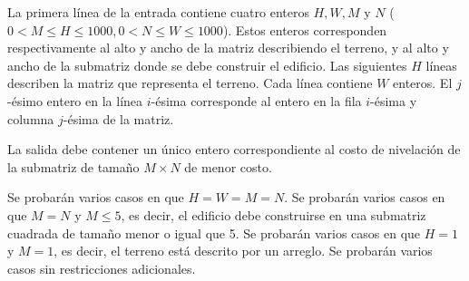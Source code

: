 \documentclass{oci}
\begin{document}
\begin{inputDescription}
  La primera línea de la entrada contiene cuatro enteros $H, W, M$ y $N$
  ($0 < M \leq H\leq 1000, 0 < N \leq W \leq 1000$).
  Estos enteros corresponden respectivamente al alto y ancho de la matriz describiendo el terreno,
  y al alto y ancho de la submatriz donde se debe construir el edificio.
  Las siguientes $H$ líneas describen la matriz que representa el terreno.
  Cada línea contiene $W$ enteros.
  El $j$-ésimo entero en la línea $i$-ésima corresponde al entero en la fila $i$-ésima y
  columna $j$-ésima de la matriz.
\end{inputDescription}

\begin{outputDescription}
  La salida debe contener un único entero correspondiente al costo de nivelación de la submatriz
  de tamaño $M\times N$ de menor costo.
\end{outputDescription}


\begin{scoreDescription}
  Se probarán varios casos en que $H=W=M=N$.
  Se probarán varios casos en que $M=N$ y $M\leq 5$, es decir, el edificio debe construirse en una
  submatriz cuadrada de tamaño menor o igual que 5.
  Se probarán varios casos en que $H=1$ y $M=1$, es decir,
  el terreno está descrito por un arreglo.
  Se probarán varios casos sin restricciones adicionales.
\end{scoreDescription}

\begin{sampleDescription}
\end{sampleDescription}
\end{document}
